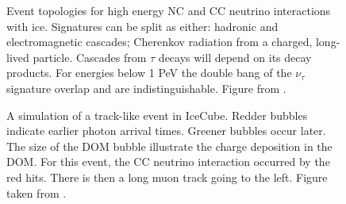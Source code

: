 \begin{figure}
    \caption{Event topologies for high energy NC and CC neutrino interactions with ice. Signatures can be split as either: hadronic and electromagnetic cascades; Cherenkov radiation from a charged, long-lived particle. Cascades from $\tau$ decays will depend on its decay products. For energies below 1 PeV the double bang of the $\nu_\tau$ signature overlap and are indistinguishable. Figure from \cite{rene_thesis_nutracks}.}
    \label{fig:}
\end{figure}

\begin{figure}
    \caption{A simulation of a track-like event in IceCube. Redder bubbles indicate earlier photon arrival times. Greener bubbles occur later. The size of the DOM bubble illustrate the charge deposition in the DOM. For this event, the CC neutrino interaction occurred by the red hits. There is then a long muon track going to the left. Figure taken from \cite{IC3_masterclass}.}
    \label{fig:ic3_track}
\end{figure}

